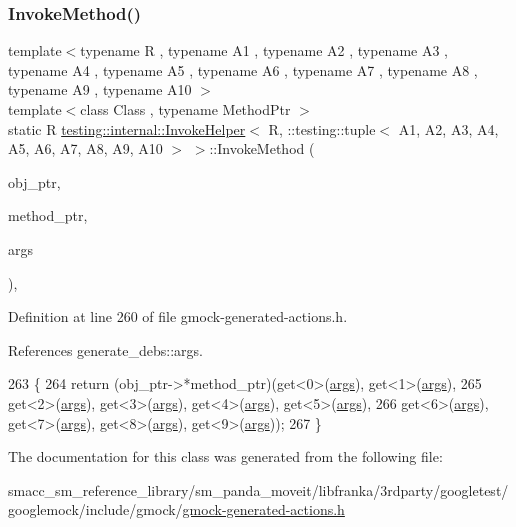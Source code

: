 \subsubsection{\texorpdfstring{Invoke\+Method()}{InvokeMethod()}}
{\footnotesize\ttfamily template$<$typename R , typename A1 , typename A2 , typename A3 , typename A4 , typename A5 , typename A6 , typename A7 , typename A8 , typename A9 , typename A10 $>$ \\
template$<$class Class , typename Method\+Ptr $>$ \\
static R \hyperlink{classtesting_1_1internal_1_1InvokeHelper}{testing\+::internal\+::\+Invoke\+Helper}$<$ R, \+::testing\+::tuple$<$ A1, A2, A3, A4, A5, A6, A7, A8, A9, A10 $>$ $>$\+::Invoke\+Method (\begin{DoxyParamCaption}\item[{Class $\ast$}]{obj\+\_\+ptr,  }\item[{Method\+Ptr}]{method\+\_\+ptr,  }\item[{const \+::testing\+::tuple$<$ A1, A2, A3, A4, A5, A6, A7, A8, A9, A10 $>$ \&}]{args }\end{DoxyParamCaption})\hspace{0.3cm}{\ttfamily [inline]}, {\ttfamily [static]}}



Definition at line 260 of file gmock-\/generated-\/actions.\+h.



References generate\+\_\+debs\+::args.


\begin{DoxyCode}
263                                             \{
264            \textcolor{keywordflow}{return} (obj\_ptr->*method\_ptr)(get<0>(\hyperlink{namespacegenerate__debs_a75f9143e38df82d83b2e8a6f99cae02c}{args}), get<1>(\hyperlink{namespacegenerate__debs_a75f9143e38df82d83b2e8a6f99cae02c}{args}),
265                get<2>(\hyperlink{namespacegenerate__debs_a75f9143e38df82d83b2e8a6f99cae02c}{args}), get<3>(\hyperlink{namespacegenerate__debs_a75f9143e38df82d83b2e8a6f99cae02c}{args}), get<4>(\hyperlink{namespacegenerate__debs_a75f9143e38df82d83b2e8a6f99cae02c}{args}), get<5>(\hyperlink{namespacegenerate__debs_a75f9143e38df82d83b2e8a6f99cae02c}{args}),
266                get<6>(\hyperlink{namespacegenerate__debs_a75f9143e38df82d83b2e8a6f99cae02c}{args}), get<7>(\hyperlink{namespacegenerate__debs_a75f9143e38df82d83b2e8a6f99cae02c}{args}), get<8>(\hyperlink{namespacegenerate__debs_a75f9143e38df82d83b2e8a6f99cae02c}{args}), get<9>(\hyperlink{namespacegenerate__debs_a75f9143e38df82d83b2e8a6f99cae02c}{args}));
267   \}
\end{DoxyCode}


The documentation for this class was generated from the following file\+:\begin{DoxyCompactItemize}
\item 
smacc\+\_\+sm\+\_\+reference\+\_\+library/sm\+\_\+panda\+\_\+moveit/libfranka/3rdparty/googletest/googlemock/include/gmock/\hyperlink{gmock-generated-actions_8h}{gmock-\/generated-\/actions.\+h}\end{DoxyCompactItemize}
